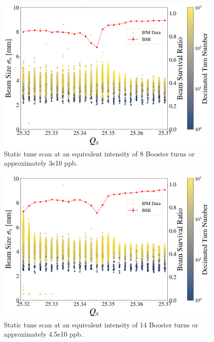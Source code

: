 \begin{figure}[H]
    \centering
    \includegraphics[width=\columnwidth]{chapter6/static8turns_dampersOFF.png}
    \caption{Static tune scan at an equivalent intensity of 8 Booster turns or approximately 3e10 ppb.}
    \label{fig:static8_scatter}
\end{figure}

\begin{figure}[H]
    \centering
    \includegraphics[width=\columnwidth]{chapter6/static14turns_dampersOFF.png}
    \caption{Static tune scan at an equivalent intensity of 14 Booster turns or approximately 4.5e10 ppb.}
    \label{fig:static14}
\end{figure}

